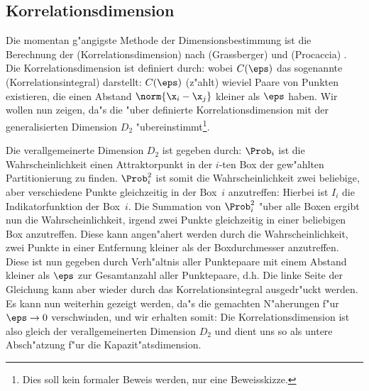 
\subsection{Korrelationsdimension}
\label{chapcorrdim}


Die momentan g"angigste Methode der Dimensionsbestimmung ist die Berechnung der
\begriff(Korrelationsdimension) nach \autor(Grassberger) und \autor(Procaccia)
\cite{Grassberger-procaccia}. Die Korrelationsdimension ist definiert durch:
wobei $C(\eps)$ das sogenannte \begriff(Korrelationsintegral) darstellt: 
$C(\eps)$ \naja(z"ahlt) wieviel Paare von Punkten existieren, die einen Abstand
$\norm{\x_i-\x_j}$ kleiner als $\eps$ haben. Wir wollen nun zeigen, da"s die "uber
 definierte Korrelationsdimension mit der generalisierten Dimension $D_2$ 
"ubereinstimmt\footnote{Dies soll kein formaler Beweis werden, nur eine Beweisskizze.}.

Die verallgemeinerte Dimension $D_2$ ist gegeben durch:
$\Prob_i$ ist die Wahrscheinlichkeit einen Attraktorpunkt in der $i$-ten Box der
gew"ahlten Partitionierung zu finden. $\Prob_i^2$ ist somit die Wahrscheinlichkeit zwei
beliebige, aber verschiedene Punkte gleichzeitig in der Box~$i$ anzutreffen:
Hierbei ist $I_i$ die Indikatorfunktion der Box~$i$.  Die Summation von $\Prob_i^2$ "uber
alle Boxen ergibt nun die Wahrscheinlichkeit, irgend zwei Punkte gleichzeitig in einer
beliebigen Box anzutreffen.  Diese kann angen"ahert werden durch die Wahrscheinlichkeit,
zwei Punkte in einer Entfernung kleiner als der Boxdurchmesser anzutreffen.
Diese ist nun gegeben durch Verh"altnis aller Punktepaare mit einem
Abstand kleiner als $\eps$ zur Gesamtanzahl aller Punktepaare, d.h.
Die linke Seite der Gleichung kann aber wieder durch das Korrelationsintegral
 ausgedr"uckt werden. Es kann nun weiterhin gezeigt werden, da"s die
gemachten N"aherungen f"ur $\eps\to0$ verschwinden, und wir erhalten somit:
Die Korrelationsdimension ist also gleich der verallgemeinerten Dimension $D_2$ und dient
uns so als untere Absch"atzung f"ur die  Kapazit"atsdimension. 


